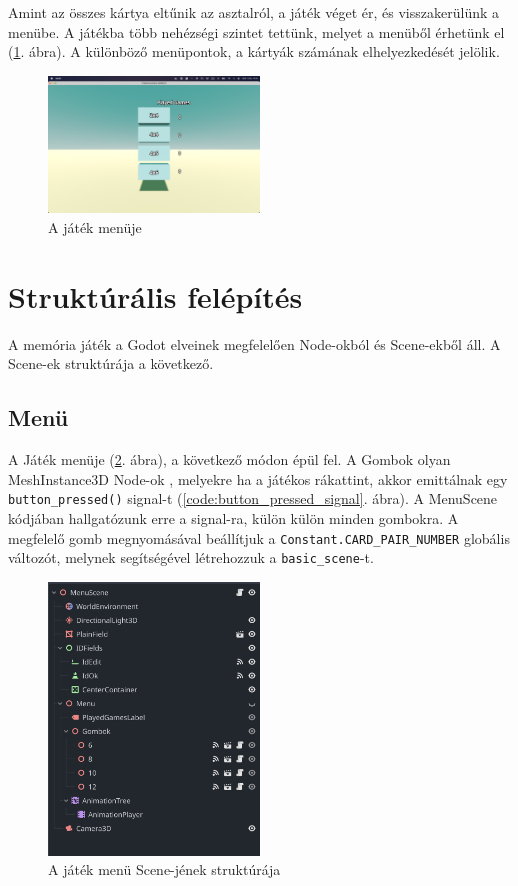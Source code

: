 Amint az összes kártya eltűnik az asztalról, a játék véget ér, és visszakerülünk a menübe.
A játékba több nehézségi szintet tettünk, melyet a menüből érhetünk el (\ref{img:menu}. ábra). A különböző menüpontok, a kártyák számának elhelyezkedését jelölik.
\begin{figure}[h]
    \centering
    \includegraphics[width=0.5\textwidth]{img/menu.png}
    \caption{A játék menüje}
    \label{img:menu}  
\end{figure}

\section{Struktúrális felépítés}
A memória játék a Godot elveinek megfelelően Node-okból és Scene-ekből \cite{godotengineNodesScenes} áll. A Scene-ek struktúrája a következő.
\subsection{Menü}


A Játék menüje (\ref{img:menu_scene}. ábra), a következő módon épül fel. A Gombok olyan MeshInstance3D Node-ok \cite{godotengineMeshInstance3D}, melyekre ha a játékos rákattint, akkor emittálnak egy \lstinline{button_pressed()} signal-t (\ref{code:button_pressed_signal}. ábra).
A MenuScene kódjában hallgatózunk erre a signal-ra, külön külön minden gombokra. A megfelelő gomb megnyomásával beállítjuk a \lstinline{Constant.CARD_PAIR_NUMBER} globális változót, melynek segítségével létrehozzuk a \lstinline{basic_scene}-t.
\begin{figure}[h]
    \centering
    \includegraphics[width=0.5\textwidth]{img/menu_scene_tree.png}
    \caption{A játék menü Scene-jének struktúrája}
    \label{img:menu_scene}  
\end{figure}

